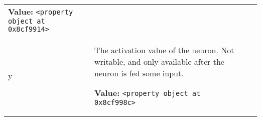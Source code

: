 \begin{longtable}{|p{}|p{}|l}
\textbf{Value:} 
{\tt {\textless}property object at 0x8cf9914{\textgreater}}&\\
\cline{1-2}
\raggedright y\- & \raggedright The activation value of the neuron. Not writable, and only available
after the neuron is fed some input.

\textbf{Value:} 
{\tt {\textless}property object at 0x8cf998c{\textgreater}}&\\
\cline{1-2}
\end{longtable}

